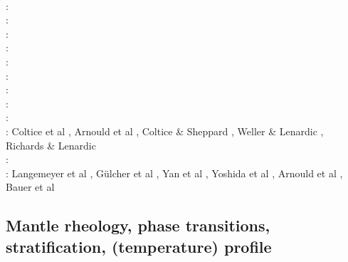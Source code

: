 \begin{scriptsize}
      \cite{vata08}\cite{gocm08}\cite{shlj08}\cite{stha08}\cite{yosh08}\\
\twothousandnine: \cite{wodd09}\cite{fobe09}\cite{gows09}\cite{deta09}\cite{onlj09}\cite{wazh09}\cite{vavv09}
      \cite{brha09}\cite{scbs09b}\cite{oebm09}\cite{fuog09}\\
\twothousandten: \cite{bumb10}\cite{detn10}\cite{yayh10}\cite{nata10}\cite{hole10}\cite{zhzl10}\cite{vayb10}
      \cite{brmw10}\\
\twothousandeleven: \cite{lowm11}\cite{rota11}\cite{woda11}\cite{lemj11}\cite{befa11}\cite{pewb11}\\
\twothousandtwelve: \cite{bisa12}\cite{cort12b}\cite{deyt12}\cite{solo12}\cite{wele12}\\
\twothousandthirteen: \cite{holj13}\cite{dadb13}\cite{toyd13}\cite{bogs13a}\cite{busa13}\cite{mika13}
      \cite{fabc13}\cite{cosr13}\cite{coml13}\cite{cost13}\cite{stha13}\cite{plth13}\cite{oflb13}\\
\twothousandfourteen: \cite{arfw14}\cite{helo14}\cite{crta14}\cite{flgw14}\cite{roct14}\cite{cort14}\cite{becr14}
      \cite{nata14}\cite{stha14}\cite{stlh14}\cite{ogaw14}\\
\twothousandfifteen: \cite{thkp15}\cite{wegg15}\cite{bect15}\cite{pesw15}\\
\twothousandsixteen: \cite{frbs16}\cite{sisc16}\cite{boba16}\cite{wele16}\cite{welm16}\cite{vade16}\cite{chah16}\\
\twothousandseventeen: \cite{ghts17}\cite{civj17}\\
\twothousandeighteen: Coltice et al \cite{cold18}, Arnould et al \cite{arcf18}, Coltice \& Sheppard \cite{cosh18}, Weller \& Lenardic \cite{wele18}, Richards \& Lenardic \cite{rile18}\\
\twothousandnineteen: \cite{gult19}\cite{mazh19}\cite{cohf19}\cite{lewh19}\cite{ulcw19}\cite{boba19}\cite{fube19}
      \cite{plju19}\\
\twothousandtwenty: Langemeyer et al \cite{lalt20}, G\"ulcher et al \cite{gugb20}, Yan et al \cite{yabt20}, Yoshida et al \cite{yosy20}, Arnould et al \cite{arcf20}, Bauer et al \cite{babd20}
\end{scriptsize}

\subsection{Mantle rheology, phase transitions, stratification, (temperature) profile}

